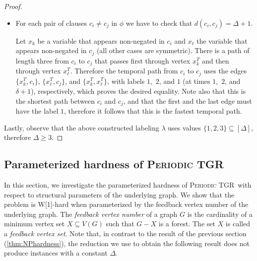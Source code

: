 \documentclass[a4paper,UKenglish,cleveref, autoref, thm-restate]{lipics-v2021}
\newcommand{\deltaExact}{\textsc{Periodic TGR}}
\begin{document}
\begin{proof}
\begin{itemize}
    \item For each pair of clauses $c_i \neq c_j$ in $\phi$ we have to check that
    $d(c_i,c_j)= \Delta + 1$.

    Let $x_k$ be a variable that appears non-negated in $c_i$
    and $x_\ell$ the variable that appears non-negated in $c_j$
    (all other cases are symmetric).
    There is a path of length three from $c_i$ to $c_j$
    that passes first through vertex $x_k^T$ and then through vertex $x_\ell^T$.
    Therefore the temporal path from $c_i$ to $c_j$
    uses the edges $\{x_k^T, c_i\}$, $\{x_\ell^T, c_j\}$, and $\{x_k^T, x_\ell ^T\}$, with labels $1$,~$2$, and $1$ (at times $1$,~$2$, and $\delta + 1$), respectively,
    which proves the desired equality.
    Note also that this is the shortest path between $c_i$ and $c_j$, and that the first and the last edge must have the label $1$,
    therefore it follows that this is the fastest temporal path.
\end{itemize}
Lastly, observe that the above constructed labeling $\lambda$ uses values $\{1,2,3\}\subseteq[\Delta]$, therefore $\Delta\ge 3$.
\end{proof}


\subsection{Parameterized hardness of \deltaExact}\label{sec:w1hardness}

In this section, we investigate the parameterized hardness of \deltaExact\ with respect to structural parameters of the underlying graph. We show that the problem is W[1]-hard when parameterized by the feedback vertex number of the underlying graph. The \emph{feedback vertex number} of a graph $G$ is the cardinality of a minimum vertex set $X\subseteq V(G)$ such that $G-X$ is a forest. The set $X$ is called a \emph{feedback vertex set}. 
Note that, in contrast to the result of the previous section (\cref{thm:NPhardness}), the reduction we use to obtain the following result does not produce instances with a constant $\Delta$.
\end{document}
